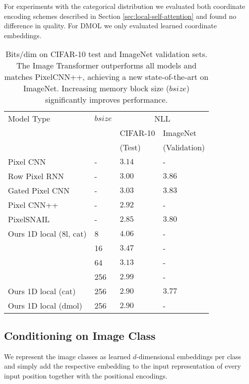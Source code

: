 \documentclass{article}
\newcommand{\modeldim}{d}
\begin{document}
For experiments with the categorical distribution we evaluated both coordinate encoding schemes described in Section \ref{sec:local-self-attention} and found no difference in quality. For DMOL we only evaluated learned coordinate embeddings.











\begin{table}\centering
\caption{Bits/dim on CIFAR-10 test and ImageNet validation sets. The Image Transformer outperforms all models and matches PixelCNN++, achieving a new state-of-the-art on ImageNet. Increasing memory block size ($bsize$) significantly improves performance.}
\vspace{2mm}


\begin{tabular}{llll}
Model Type & $bsize$ & \multicolumn{2}{c}{NLL}  \\
 & & CIFAR-10 & ImageNet \\
 & & (Test) & (Validation) \\
\hline
Pixel CNN & - & $3.14$ & -\\
Row Pixel RNN & - &  $3.00$ & $3.86$ \\
Gated Pixel CNN & - & $3.03$ & $3.83$\\
Pixel CNN++ & - & $2.92$ & -\\
PixelSNAIL & - & $\mathbf{2.85}$ & $3.80$\\
\hline
Ours 1D local (8l, cat) & 8 & $4.06$ & - \\
 & 16 & $3.47$ & - \\
 & 64 & $3.13$ & - \\
 & 256 & $2.99$ & - \\ \hline
Ours 1D local (cat) & 256 & $2.90$ & $\mathbf{3.77}$ \\
Ours 1D local (dmol) & 256 & $2.90$ & -
\label{tab:generative-log-probs}

\end{tabular}
\end{table}

\subsection{Conditioning on Image Class}
We represent the image classes as learned $\modeldim$-dimensional embeddings per class and simply add the respective embedding to the input representation of every input position together with the positional encodings.
\end{document}
